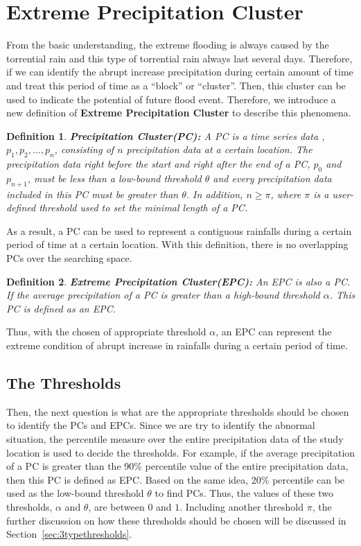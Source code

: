 \documentclass{acm_proc_article-sp}
\begin{document}
\section{Extreme Precipitation Cluster}
\label{sec:EPC}
\newtheorem{mydef}{Definition}
From the basic understanding, the extreme flooding is always caused by the
torrential rain and this type of torrential rain always last several days.
Therefore, if we can identify the abrupt increase precipitation during certain
amount of time and treat this period of time as a ``block'' or ``cluster''.
Then, this cluster can be used to indicate the potential of future flood event.
Therefore, we introduce a new definition of \textbf{Extreme Precipitation
Cluster} to describe this phenomena.
\begin{mydef} 
\label{def:PC}
\textbf{Precipitation Cluster(PC):} A PC is a time series data , $p_1 , p_2 ,
\ldots , p_n $, consisting of $n$ precipitation data at a certain location. The
precipitation data right before the start and right after the end of a PC, $p_0$
and $p_{n+1}$, must be less than a low-bound threshold $\theta$ and every
precipitation data included in this PC must be greater than $\theta$. In
addition, $n \geq \pi $, where $\pi $ is a user-defined threshold used to set
the minimal length of a PC.
\end{mydef} 
As a result, a PC can be used to represent a contiguous rainfalls during a
certain period of time at a certain location. With this definition, there is
no overlapping PCs over the searching space.
\begin{mydef}
\label{def:EPC}
\textbf{Extreme Precipitation Cluster(EPC):} An EPC is also a PC. If the
average precipitation of a PC is greater than a high-bound threshold $\alpha$. This PC is
defined as an EPC.
\end{mydef} 
Thus, with the chosen of appropriate threshold $\alpha$, an EPC can represent the extreme condition of abrupt increase in rainfalls during a certain period of time.
\subsection{The Thresholds}
\label{sec:Thresholds}
Then, the next question is what are the appropriate thresholds should be chosen to identify the PCs and EPCs. Since we are try to identify the abnormal situation, the percentile measure over the entire precipitation data of the study location is used to decide the thresholds. For example, if the average precipitation of a PC is greater than the 90\% percentile value of the entire precipitation data, then this PC is defined as EPC. Based on the same idea, 20\% percentile can be used as the low-bound threshold $\theta$ to find PCs.
Thus, the values of these two thresholds, $\alpha$ and $\theta$, are between $0$ and $1$. Including another threshold $\pi$, the further discussion on how these thresholds should be chosen will be discussed in Section~\ref{sec:3typethresholds}.      
\end{document}
